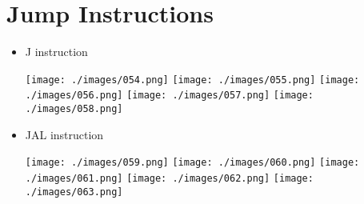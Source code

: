 \documentclass[a4paper, 12pt]{article}
\begin{document}
	\newpage
	
	\section{Jump Instructions}
	
	\begin{itemize}
		\item J instruction
		
		\texttt{[image: ./images/054.png]}
		\texttt{[image: ./images/055.png]}
		\texttt{[image: ./images/056.png]}
		\texttt{[image: ./images/057.png]}
		\texttt{[image: ./images/058.png]}
		
		\newpage
		
		\item JAL instruction
		
		\texttt{[image: ./images/059.png]}
		\texttt{[image: ./images/060.png]}
		\texttt{[image: ./images/061.png]}
		\texttt{[image: ./images/062.png]}
		\texttt{[image: ./images/063.png]}
		
	\end{itemize}
\end{document}
